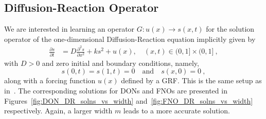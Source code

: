 \subsection{Diffusion-Reaction Operator}
We are interested in learning an operator $G: u(x) \to s(x,t)$ for the solution operator of the one-dimensional Diffusion-Reaction equation implicitly given by
\begin{equation}
\label{eq:dr-eq}
\begin{aligned}
    \frac{\partial s}{\partial t}&=D \frac{\partial^2 s}{\partial x^2}+k s^2+u(x), \quad(x, t) \in(0,1] \times(0,1]~,
\end{aligned}
\end{equation}
with $D>0$ and zero initial and boundary conditions, namely, 
\begin{equation*}
    s(0, t) = s(1, t) = 0 \quad \text{and}\quad s(x, 0) = 0~,
\end{equation*}
along with a forcing function $u(x)$ defined by a GRF. This is the same setup as in~\citep{physicsInformed202WangPerdikaris,lu20201DeepONet}. The corresponding solutions for DONs and FNOs are presented in Figures~\ref{fig:DON_DR_solns_vs_width} and~\ref{fig:FNO_DR_solns_vs_width} respectively. Again, a larger width $m$ leads to a more accurate solution.

